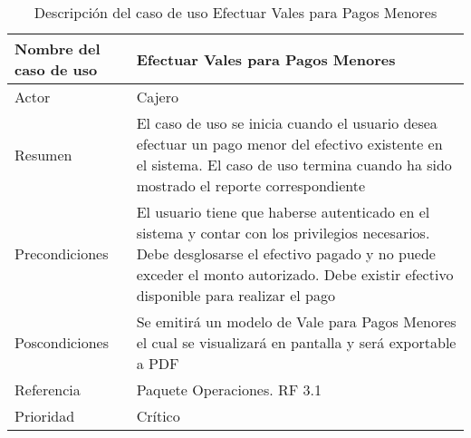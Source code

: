 \begin{table}[H]
	\sf
	\begin{supertabular}{|p{4.5cm}|p{12cm}|}
		\hline
		\textbf{Nombre del caso de uso}
		& \textbf{Efectuar Vales para Pagos Menores} \\ \hline
		
		Actor
		& Cajero \\ \hline
		
		Resumen
		& El caso de uso se inicia cuando el usuario desea efectuar un pago menor del efectivo existente en el sistema. El caso de uso termina cuando ha sido mostrado el reporte correspondiente \\ \hline
		
		Precondiciones
		& El usuario tiene que haberse autenticado en el sistema y contar con los privilegios necesarios. Debe desglosarse el efectivo pagado y no puede exceder el monto autorizado. Debe existir efectivo disponible para realizar el pago \\ \hline
		
		Poscondiciones
		& Se emitirá un modelo de Vale para Pagos Menores el cual se visualizará en pantalla y será exportable a PDF \\ \hline
		
		Referencia
		& Paquete Operaciones. RF 3.1 \\ \hline
		
		Prioridad
		& Crítico \\		
		\hline
	\end{supertabular}
	\caption[Descripción del caso de uso Efectuar Vales para Pagos Menores]{Descripción del caso de uso Efectuar Vales para Pagos Menores}
	\label{table:CU_ValePM}
\end{table}

